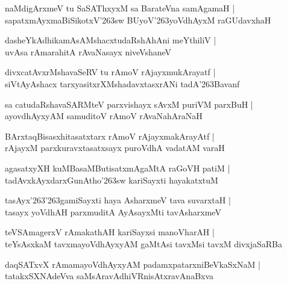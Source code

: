 \documentclass[twoside,12pt,openright]{book}
\def\S{\char'263}
\newcounter{shloka}[chapter]
\begin{document}
\begin{shloka}%
naMdigArxmeV tu SaSAThxyxM  sa BarateVna samAgamaH |\\
sapatxmAyxmaBiSikotxV\S sw BUyoV\S yoVdhAyxM raGUdavxhaH 
\end{shloka}

\begin{shloka}%
dasheYkAdhikamAsAMshacxtudaRshAhAni meYthiliV |\\
uvAsa rAmarahitA rAvaNasayx niveVshaneV
\end{shloka}

\begin{shloka}%
divxcatAvxrMshavaSeRV tu rAmoV rAjayxmukArayatf |\\
siVtAyAshacx tarxyasitxrXMshadavxtasxrANi tadA\S Bavanf 
\end{shloka}

\begin{shloka}%
sa catudaRshavaSARMteV parxvishayx sAvxM puriVM parxBuH |\\
ayovdhAyxyAM samuditoV rAmoV rAvaNahAraNaH 
\end{shloka}

\begin{shloka}%
BArxtaqBisasxhitasatxtarx rAmoV rAjayxmakArayAtf |\\
rAjayxM parxkuravxtasatxsayx puroVdhA vadatAM varaH 
\end{shloka}

\begin{shloka}%
agasatxyXH kuMBasaMButisatxmAgaMtA raGoVH patiM |\\
tadAvxkAyxdarxGunAtho\S sw kariSayxti hayakatxtuM 
\end{shloka}

\begin{shloka}%
tasAyx\S \S gamiSayxti haya AsharxmeV tava suvarxtaH |\\
tasayx yoVdhAH parxmuditA AyAsayxMti tavAsharxmeV 
\end{shloka}

\begin{shloka}%
teVSAmagerxV rAmakathAH kariSayxsi manoVharAH |\\
teYsAsxkaM tavxmayoVdhAyxyAM gaMtAsi tavxMsi tavxM divxjaSaRBa
\end{shloka}

\begin{shloka}%
daqSATxvX rAmamayoVdhAyxyAM padamxpatarxniBeVkaSxNaM |\\
tatakxSXNAdeVva saMsAravAdhiVRnisAtxravAnaBxva
\end{shloka}
\end{document}
